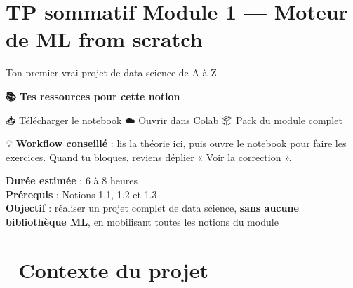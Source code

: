 \documentclass[
  french,
  11pt,
  a4paper,
]{scrbook}
\begin{document}
\chapter{TP sommatif Module 1 --- Moteur de ML from
scratch}\label{tp-sommatif-module-1-moteur-de-ml-from-scratch}

Ton premier vrai projet de data science de A à Z

\hfill\break

\begin{tcolorbox}[enhanced jigsaw, arc=.35mm, bottomrule=.15mm, breakable, colback=white, colframe=quarto-callout-note-color-frame, left=2mm, leftrule=.75mm, opacityback=0, rightrule=.15mm, toprule=.15mm]

\vspace{-3mm}\textbf{📚 Tes ressources pour cette notion}\vspace{3mm}

📥 Télécharger le notebook ☁️ Ouvrir dans Colab 📦 Pack du module
complet

💡 \textbf{Workflow conseillé} : lis la théorie ici, puis ouvre le
notebook pour faire les exercices. Quand tu bloques, reviens déplier «
Voir la correction ».

\end{tcolorbox}

\begin{tcolorbox}[enhanced jigsaw, arc=.35mm, bottomrule=.15mm, breakable, colback=white, colframe=quarto-callout-important-color-frame, left=2mm, leftrule=.75mm, opacityback=0, rightrule=.15mm, toprule=.15mm]
\begin{minipage}[t]{5.5mm}
\textcolor{quarto-callout-important-color}{\faExclamation}
\end{minipage}%
\begin{minipage}[t]{\textwidth - 5.5mm}

\textbf{Durée estimée} : 6 à 8 heures\\
\textbf{Prérequis} : Notions 1.1, 1.2 et 1.3\\
\textbf{Objectif} : réaliser un projet complet de data science,
\textbf{sans aucune bibliothèque ML}, en mobilisant toutes les notions
du module

\end{minipage}%
\end{tcolorbox}

\chapter{🎯 Contexte du projet}\label{contexte-du-projet}
\end{document}
